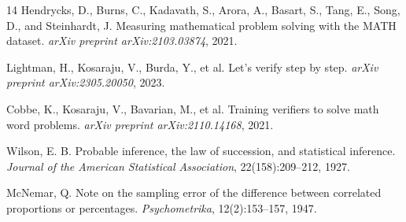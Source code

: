 \documentclass[11pt]{article}
\begin{document}
\begin{thebibliography}{14}
Hendrycks, D., Burns, C., Kadavath, S., Arora, A., Basart, S., Tang, E., Song, D., and Steinhardt, J.
Measuring mathematical problem solving with the MATH dataset.
\emph{arXiv preprint arXiv:2103.03874}, 2021.

Lightman, H., Kosaraju, V., Burda, Y., et al.
Let's verify step by step.
\emph{arXiv preprint arXiv:2305.20050}, 2023.

Cobbe, K., Kosaraju, V., Bavarian, M., et al.
Training verifiers to solve math word problems.
\emph{arXiv preprint arXiv:2110.14168}, 2021.

Wilson, E. B.
Probable inference, the law of succession, and statistical inference.
\emph{Journal of the American Statistical Association}, 22(158):209--212, 1927.

McNemar, Q.
Note on the sampling error of the difference between correlated proportions or percentages.
\emph{Psychometrika}, 12(2):153--157, 1947.

\end{thebibliography}
\end{document}
